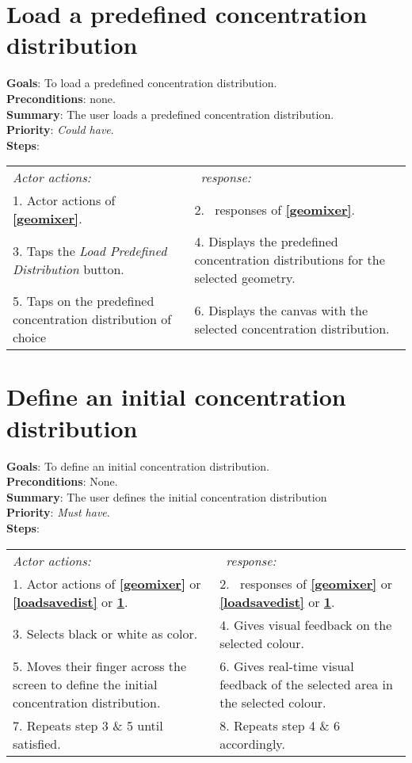  \section{Load a predefined concentration distribution}
  \label{loadpreddist}
  \textbf{Goals}: To load a predefined concentration distribution.\\
  \textbf{Preconditions}: none.\\
  \textbf{Summary}: The user loads a predefined concentration distribution.\\
  \textbf{Priority}: \emph{Could have}.\\
  \textbf{Steps}: \\
  \begin{tabular}{ p{} p{} }
  	\emph{Actor actions:} & \emph{\projectname\ response:} \\
  	1. Actor actions of \textbf{\ref{geomixer}}. & 2. \projectname\ responses of \textbf{\ref{geomixer}}. \\
	3. Taps the \emph{Load Predefined Distribution} button. & 4. Displays the predefined concentration distributions for the selected geometry. \\
	5. Taps on the predefined concentration distribution of choice & 6. Displays the canvas with the selected concentration distribution. \\
  \end{tabular}

  \section{Define an initial concentration distribution}
  \label{initdist}
  \textbf{Goals}: To define an initial concentration distribution.\\
  \textbf{Preconditions}: None. \\ %
  \textbf{Summary}: The user defines the initial concentration distribution\\
  \textbf{Priority}: \emph{Must have}.\\
  \textbf{Steps}: \\
  \begin{tabular}{ p{} p{} }
  	\emph{Actor actions:} & \emph{\projectname\ response:} \\
  	1. Actor actions of \textbf{\ref{geomixer}} or \textbf{\ref{loadsavedist}} or \textbf{\ref{loadpreddist}}. & 2. \projectname\ responses of \textbf{\ref{geomixer}} or \textbf{\ref{loadsavedist}} or  \textbf{\ref{loadpreddist}}.\\
	3. Selects black or white as color. & 4. Gives visual feedback on the selected colour. \\
	5. Moves their finger across the screen to define the initial concentration distribution. & 6. Gives real-time visual feedback of the selected area in the selected colour.\\
      7. Repeats step 3 \& 5 until satisfied. & 8. Repeats step 4 \& 6 accordingly. \\
      \end{tabular}

